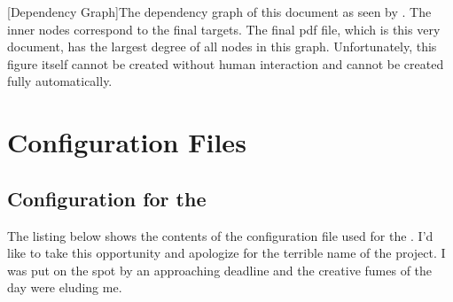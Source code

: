 \noindent%
\begin{minipage}{\linewidth}%
[Dependency Graph]{The dependency graph of this document as seen by \make. The inner nodes correspond to the final targets. 
The final pdf file, which is this very document, has the largest degree of all nodes in this graph. Unfortunately, this figure itself cannot 
be created without human interaction and cannot be created fully automatically.  
\label{fig:dep_graph}}%
\end{minipage}


\chapter{Configuration Files}
\label{ap:config}

\section{Configuration for the \aicttools}
\label{ap:aict_config}

The listing below shows the contents of the configuration file used for the \aicttools.
I'd like to take this opportunity and apologize for the terrible name of the \aicttools project.  
I was put on the spot by an approaching deadline and the creative fumes of the day were eluding me. 

\begin{spacing}{0.5}
  
\end{spacing}


